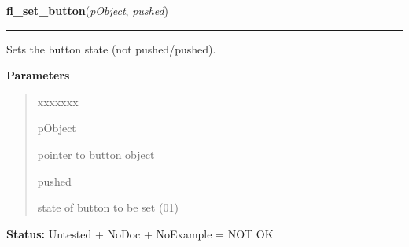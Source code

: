 \hspace{.8\funcindent}\begin{boxedminipage}{\funcwidth}

    \raggedright \textbf{fl\_set\_button}(\textit{pObject}, \textit{pushed})

    \vspace{-1.5ex}

    \rule{\textwidth}{0.5\fboxrule}
\setlength{\parskip}{2ex}
    Sets the button state (not pushed/pushed).

\setlength{\parskip}{1ex}
      \textbf{Parameters}
      \vspace{-1ex}

      \begin{quote}
        \begin{Ventry}{xxxxxxx}

          \item[pObject]

          pointer to button object

          \item[pushed]

          state of button to be set (0{\textbar}1)

        \end{Ventry}

      \end{quote}

\textbf{Status:} Untested + NoDoc + NoExample = NOT OK



    \end{boxedminipage}

    \label{xformslib:library:fl_get_button_numb}

    \vspace{0.5ex}

